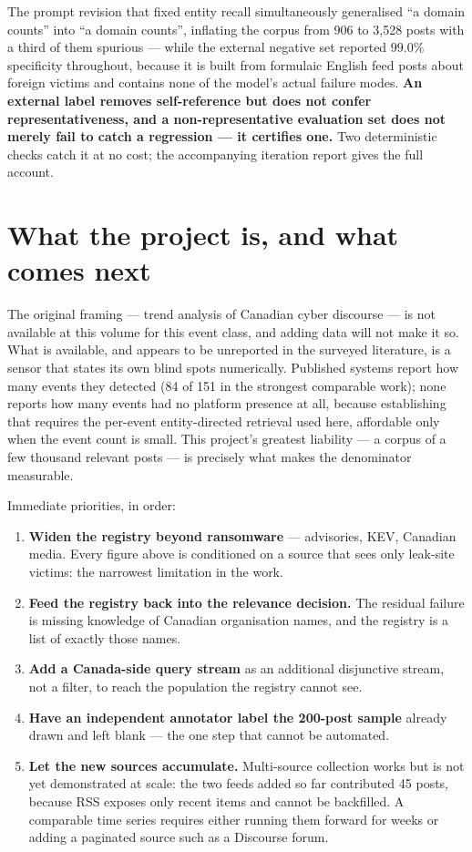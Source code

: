 \documentclass[11pt]{article}
\begin{document}
The prompt revision that fixed entity recall simultaneously generalised ``a
 domain counts'' into ``a domain counts'', inflating the corpus from
906 to 3{,}528 posts with a third of them spurious --- while the external
negative set reported $99.0\%$ specificity throughout, because it is built from
formulaic English feed posts about foreign victims and contains none of the
model's actual failure modes. \textbf{An external label removes self-reference
but does not confer representativeness, and a non-representative evaluation set
does not merely fail to catch a regression --- it certifies one.} Two
deterministic checks catch it at no cost; the accompanying iteration report
gives the full account.

\section*{\color{accent}What the project is, and what comes next}

The original framing --- trend analysis of Canadian cyber discourse --- is not
available at this volume for this event class, and adding data will not make it
so. What is available, and appears to be unreported in the surveyed
literature, is a sensor that states its own blind spots numerically. Published
systems report how many events they detected (84 of 151 in the strongest
comparable work); none reports how many events had no platform presence at
all, because establishing that requires the per-event entity-directed
retrieval used here, affordable only when the event count is small. This project's greatest
liability --- a corpus of a few thousand relevant posts --- is precisely what
makes the denominator measurable.

Immediate priorities, in order:

\begin{enumerate}[leftmargin=1.5em,itemsep=2pt]
\item \textbf{Widen the registry beyond ransomware} --- advisories, KEV,
Canadian media. Every figure above is conditioned on a source that sees only
leak-site victims: the narrowest limitation in the work.
\item \textbf{Feed the registry back into the relevance decision.} The residual
failure is missing knowledge of Canadian organisation names, and the registry
is a list of exactly those names.
\item \textbf{Add a Canada-side query stream} as an additional disjunctive
stream, not a filter, to reach the population the registry cannot see.
\item \textbf{Have an independent annotator label the 200-post sample} already
drawn and left blank --- the one step that cannot be automated.
\item \textbf{Let the new sources accumulate.} Multi-source collection works but
is not yet demonstrated at scale: the two feeds added so far contributed 45
posts, because RSS exposes only recent items and cannot be backfilled. A
comparable time series requires either running them forward for weeks or adding
a paginated source such as a Discourse forum.
\end{enumerate}
\end{document}
